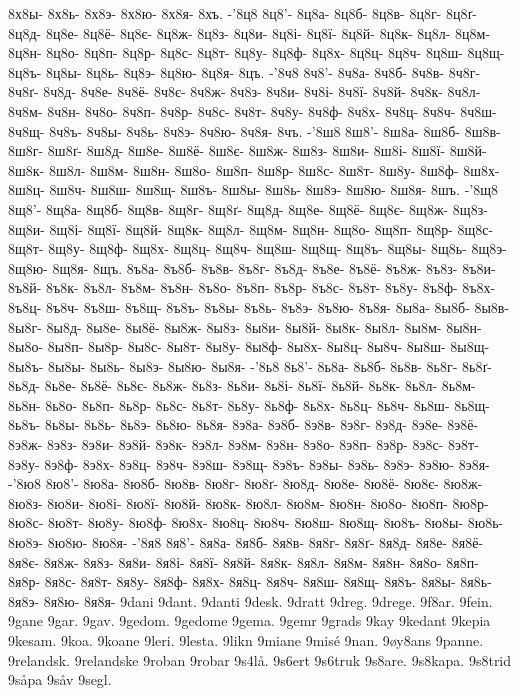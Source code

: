 8х8ы-
8х8ь-
8х8э-
8х8ю-
8х8я-
8хъ.
-'8ц8
8ц8'-
8ц8а-
8ц8б-
8ц8в-
8ц8г-
8ц8ґ-
8ц8д-
8ц8е-
8ц8ё-
8ц8є-
8ц8ж-
8ц8з-
8ц8и-
8ц8і-
8ц8ї-
8ц8й-
8ц8к-
8ц8л-
8ц8м-
8ц8н-
8ц8о-
8ц8п-
8ц8р-
8ц8с-
8ц8т-
8ц8у-
8ц8ф-
8ц8х-
8ц8ц-
8ц8ч-
8ц8ш-
8ц8щ-
8ц8ъ-
8ц8ы-
8ц8ь-
8ц8э-
8ц8ю-
8ц8я-
8цъ.
-'8ч8
8ч8'-
8ч8а-
8ч8б-
8ч8в-
8ч8г-
8ч8ґ-
8ч8д-
8ч8е-
8ч8ё-
8ч8є-
8ч8ж-
8ч8з-
8ч8и-
8ч8і-
8ч8ї-
8ч8й-
8ч8к-
8ч8л-
8ч8м-
8ч8н-
8ч8о-
8ч8п-
8ч8р-
8ч8с-
8ч8т-
8ч8у-
8ч8ф-
8ч8х-
8ч8ц-
8ч8ч-
8ч8ш-
8ч8щ-
8ч8ъ-
8ч8ы-
8ч8ь-
8ч8э-
8ч8ю-
8ч8я-
8чъ.
-'8ш8
8ш8'-
8ш8а-
8ш8б-
8ш8в-
8ш8г-
8ш8ґ-
8ш8д-
8ш8е-
8ш8ё-
8ш8є-
8ш8ж-
8ш8з-
8ш8и-
8ш8і-
8ш8ї-
8ш8й-
8ш8к-
8ш8л-
8ш8м-
8ш8н-
8ш8о-
8ш8п-
8ш8р-
8ш8с-
8ш8т-
8ш8у-
8ш8ф-
8ш8х-
8ш8ц-
8ш8ч-
8ш8ш-
8ш8щ-
8ш8ъ-
8ш8ы-
8ш8ь-
8ш8э-
8ш8ю-
8ш8я-
8шъ.
-'8щ8
8щ8'-
8щ8а-
8щ8б-
8щ8в-
8щ8г-
8щ8ґ-
8щ8д-
8щ8е-
8щ8ё-
8щ8є-
8щ8ж-
8щ8з-
8щ8и-
8щ8і-
8щ8ї-
8щ8й-
8щ8к-
8щ8л-
8щ8м-
8щ8н-
8щ8о-
8щ8п-
8щ8р-
8щ8с-
8щ8т-
8щ8у-
8щ8ф-
8щ8х-
8щ8ц-
8щ8ч-
8щ8ш-
8щ8щ-
8щ8ъ-
8щ8ы-
8щ8ь-
8щ8э-
8щ8ю-
8щ8я-
8щъ.
8ъ8а-
8ъ8б-
8ъ8в-
8ъ8г-
8ъ8д-
8ъ8е-
8ъ8ё-
8ъ8ж-
8ъ8з-
8ъ8и-
8ъ8й-
8ъ8к-
8ъ8л-
8ъ8м-
8ъ8н-
8ъ8о-
8ъ8п-
8ъ8р-
8ъ8с-
8ъ8т-
8ъ8у-
8ъ8ф-
8ъ8х-
8ъ8ц-
8ъ8ч-
8ъ8ш-
8ъ8щ-
8ъ8ъ-
8ъ8ы-
8ъ8ь-
8ъ8э-
8ъ8ю-
8ъ8я-
8ы8а-
8ы8б-
8ы8в-
8ы8г-
8ы8д-
8ы8е-
8ы8ё-
8ы8ж-
8ы8з-
8ы8и-
8ы8й-
8ы8к-
8ы8л-
8ы8м-
8ы8н-
8ы8о-
8ы8п-
8ы8р-
8ы8с-
8ы8т-
8ы8у-
8ы8ф-
8ы8х-
8ы8ц-
8ы8ч-
8ы8ш-
8ы8щ-
8ы8ъ-
8ы8ы-
8ы8ь-
8ы8э-
8ы8ю-
8ы8я-
-'8ь8
8ь8'-
8ь8а-
8ь8б-
8ь8в-
8ь8г-
8ь8ґ-
8ь8д-
8ь8е-
8ь8ё-
8ь8є-
8ь8ж-
8ь8з-
8ь8и-
8ь8і-
8ь8ї-
8ь8й-
8ь8к-
8ь8л-
8ь8м-
8ь8н-
8ь8о-
8ь8п-
8ь8р-
8ь8с-
8ь8т-
8ь8у-
8ь8ф-
8ь8х-
8ь8ц-
8ь8ч-
8ь8ш-
8ь8щ-
8ь8ъ-
8ь8ы-
8ь8ь-
8ь8э-
8ь8ю-
8ь8я-
8э8а-
8э8б-
8э8в-
8э8г-
8э8д-
8э8е-
8э8ё-
8э8ж-
8э8з-
8э8и-
8э8й-
8э8к-
8э8л-
8э8м-
8э8н-
8э8о-
8э8п-
8э8р-
8э8с-
8э8т-
8э8у-
8э8ф-
8э8х-
8э8ц-
8э8ч-
8э8ш-
8э8щ-
8э8ъ-
8э8ы-
8э8ь-
8э8э-
8э8ю-
8э8я-
-'8ю8
8ю8'-
8ю8а-
8ю8б-
8ю8в-
8ю8г-
8ю8ґ-
8ю8д-
8ю8е-
8ю8ё-
8ю8є-
8ю8ж-
8ю8з-
8ю8и-
8ю8і-
8ю8ї-
8ю8й-
8ю8к-
8ю8л-
8ю8м-
8ю8н-
8ю8о-
8ю8п-
8ю8р-
8ю8с-
8ю8т-
8ю8у-
8ю8ф-
8ю8х-
8ю8ц-
8ю8ч-
8ю8ш-
8ю8щ-
8ю8ъ-
8ю8ы-
8ю8ь-
8ю8э-
8ю8ю-
8ю8я-
-'8я8
8я8'-
8я8а-
8я8б-
8я8в-
8я8г-
8я8ґ-
8я8д-
8я8е-
8я8ё-
8я8є-
8я8ж-
8я8з-
8я8и-
8я8і-
8я8ї-
8я8й-
8я8к-
8я8л-
8я8м-
8я8н-
8я8о-
8я8п-
8я8р-
8я8с-
8я8т-
8я8у-
8я8ф-
8я8х-
8я8ц-
8я8ч-
8я8ш-
8я8щ-
8я8ъ-
8я8ы-
8я8ь-
8я8э-
8я8ю-
8я8я-
9dani
9dant.
9danti
9desk.
9dratt
9dreg.
9drege.
9f8ar.
9fein.
9gane
9gar.
9gav.
9gedom.
9gedome
9gema.
9gemr
9grads
9kay
9kedant
9kepia
9kesam.
9koa.
9koane
9leri.
9lesta.
9likn
9miane
9misé
9nan.
9øy8ans
9panne.
9relandsk.
9relandske
9roban
9robar
9s4lå.
9s6ert
9s6truk
9s8are.
9s8kapa.
9s8trid
9såpa
9såv
9segl.
